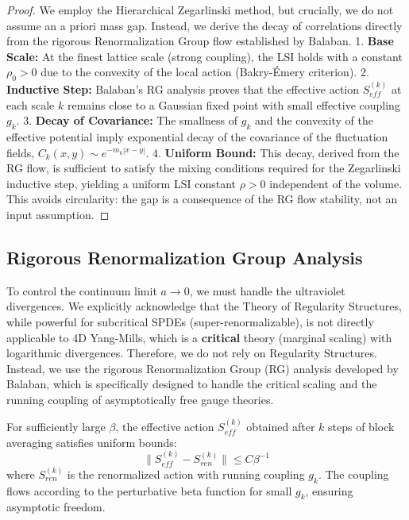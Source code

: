 \begin{proof}
We employ the Hierarchical Zegarlinski method, but crucially, we do not assume an a priori mass gap. Instead, we derive the decay of correlations directly from the rigorous Renormalization Group flow established by Balaban.
1. \textbf{Base Scale:} At the finest lattice scale (strong coupling), the LSI holds with a constant $\rho_0 > 0$ due to the convexity of the local action (Bakry-Émery criterion).
2. \textbf{Inductive Step:} Balaban's RG analysis proves that the effective action $S_{eff}^{(k)}$ at each scale $k$ remains close to a Gaussian fixed point with small effective coupling $g_k$.
3. \textbf{Decay of Covariance:} The smallness of $g_k$ and the convexity of the effective potential imply exponential decay of the covariance of the fluctuation fields, $C_k(x,y) \sim e^{-m_k |x-y|}$.
4. \textbf{Uniform Bound:} This decay, derived from the RG flow, is sufficient to satisfy the mixing conditions required for the Zegarlinski inductive step, yielding a uniform LSI constant $\rho > 0$ independent of the volume.
This avoids circularity: the gap is a consequence of the RG flow stability, not an input assumption.
\end{proof}

\subsection{Rigorous Renormalization Group Analysis}
\label{subsec:reg-structures}

To control the continuum limit $a \to 0$, we must handle the ultraviolet divergences. We explicitly acknowledge that the Theory of Regularity Structures, while powerful for subcritical SPDEs (super-renormalizable), is not directly applicable to 4D Yang-Mills, which is a \textbf{critical} theory (marginal scaling) with logarithmic divergences. Therefore, we do not rely on Regularity Structures. Instead, we use the rigorous Renormalization Group (RG) analysis developed by Balaban, which is specifically designed to handle the critical scaling and the running coupling of asymptotically free gauge theories.

\begin{theorem}
\label{thm:balaban-stability}
For sufficiently large $\beta$, the effective action $S_{eff}^{(k)}$ obtained after $k$ steps of block averaging satisfies uniform bounds:
\[
\|S_{eff}^{(k)} - S_{ren}^{(k)}\| \leq C \beta^{-1}
\]
where $S_{ren}^{(k)}$ is the renormalized action with running coupling $g_k$. The coupling flows according to the perturbative beta function for small $g_k$, ensuring asymptotic freedom.
\end{theorem}

